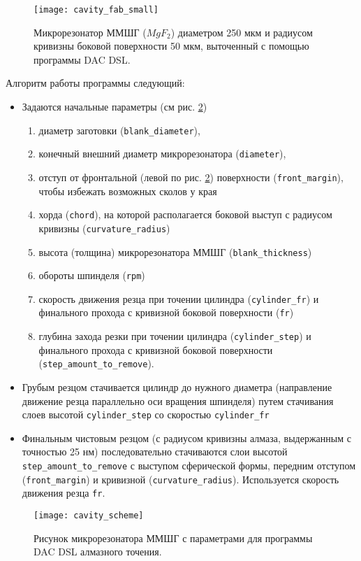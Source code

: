 \begin{figure}[ht]
\centering
  \texttt{[image: cavity\_fab\_small]}
  \caption{Микрорезонатор ММШГ ($MgF_2$) диаметром 250 мкм и радиусом кривизны боковой поверхности 50 мкм, выточенный с помощью программы DAC DSL.}
  \label{cavity_small}
\end{figure}

Алгоритм работы программы следующий:
\begin{itemize}
  \item Задаются начальные параметры (см рис. \ref{cavity_scheme})
  \begin{enumerate}
    \item диаметр заготовки (\texttt{blank\_diameter}),
    \item конечный внешний диаметр микрорезонатора (\texttt{diameter}),
    \item отступ от фронтальной (левой по рис. \ref{cavity_scheme}) поверхности (\texttt{front\_margin}), чтобы избежать возможных сколов у края
    \item хорда (\texttt{chord}), на которой располагается боковой выступ с радиусом кривизны (\texttt{curvature\_radius})
    \item высота (толщина) микрорезонатора ММШГ (\texttt{blank\_thickness})
    \item обороты шпинделя (\texttt{rpm})
    \item скорость движения резца при точении цилиндра (\texttt{cylinder\_fr}) и финального прохода с кривизной боковой поверхности (\texttt{fr})
    \item глубина захода резки при точении цилиндра (\texttt{cylinder\_step}) и финального прохода с кривизной боковой поверхности (\texttt{step\_amount\_to\_remove}).
  \end{enumerate}
  \item Грубым резцом стачивается цилиндр до нужного диаметра (направление движение резца параллельно оси вращения шпинделя) путем стачивания слоев высотой \texttt{cylinder\_step} со скоростью \texttt{cylinder\_fr}
  \item Финальным чистовым резцом (с радиусом кривизны алмаза, выдержанным с точностью 25 нм) последовательно стачиваются слои высотой \texttt{step\_amount\_to\_remove} с выступом сферической формы, передним отступом (\texttt{front\_margin}) и кривизной (\texttt{curvature\_radius}). Используется скорость движения резца \texttt{fr}.
\end{itemize}

\begin{figure}[ht]
\centering
  \texttt{[image: cavity\_scheme]}
  \caption{Рисунок микрорезонатора ММШГ с параметрами для программы DAC DSL алмазного точения.}
  \label{cavity_scheme}
\end{figure}

